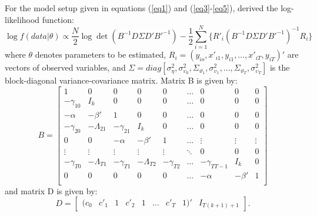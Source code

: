 \documentclass[a4paper]{article}
\begin{document}
\indent For the model setup given in equations (\ref{eq1}) and (\ref{eq3}-\ref{eq5}), \citet{Moral+2013} derived the log-likelihood function:
\begin{equation}\label{eq6}
    \log f(data|\theta) \propto \frac{N}{2}\log\det(B^{-1}D\Sigma D'B'^{-1})-\frac{1}{2}\sum_{i=1}^{N}\{R'_{i}(B^{-1}D\Sigma D'B'^{-1})^{-1}R_{i}\}
\end{equation}
\noindent where $\theta$ denotes parameters to be estimated, $R_{i}=(y_{io},x'_{i1},y_{i1},\dots,x'_{iT},y_{iT})'$ are vectors of observed variables, and $\Sigma=diag[\sigma^{2}_{\eta},\sigma^{2}_{\upsilon_{0}},\Sigma_{\vartheta_{1}},\sigma^{2}_{\upsilon_{1}},...,\Sigma_{\vartheta_{T}},\sigma^{2}_{\upsilon_{T}}]$ is the block-diagonal variance-covariance matrix. Matrix B is given by:
\begin{equation}\label{eq7}
B=\begin{bmatrix}
 1&0&0&0&0&\dotsc& 0&0&0\\
 -\gamma_{10}&I_{k}&0&0&0&\dotsc&0&0&0\\
 -\alpha&-\beta'&1&0&0&\dotsc&0&0&0\\
 -\gamma_{20}&-\Lambda_{21}&-\gamma_{21}&I_{k}&0&\dotsc&0&0&0\\
0&0&-\alpha&-\beta'&1&\dotsc&\vdots&\vdots&\vdots\\
\vdots&\vdots&\vdots&\vdots&\vdots&\ddots&0&0&0\\
 -\gamma_{T0}&-\Lambda_{T1}&-\gamma_{T1}&-\Lambda_{T2}&-\gamma_{T2}&\dotsc&-\gamma_{TT-1}&I_{k}&0\\
 0&0&0&0&0&\dotsc&-\alpha&-\beta'&1\\
\end{bmatrix}
\end{equation}
and matrix D is given by:
\begin{equation}\label{eq8}
D=\begin{bmatrix}
(c_{0}&c'_{1}&1&c'_{2}&1&\dotsc&c'_{T}&1)' & I_{T(k+1) + 1}
 \end{bmatrix}.
\end{equation}
\end{document}
